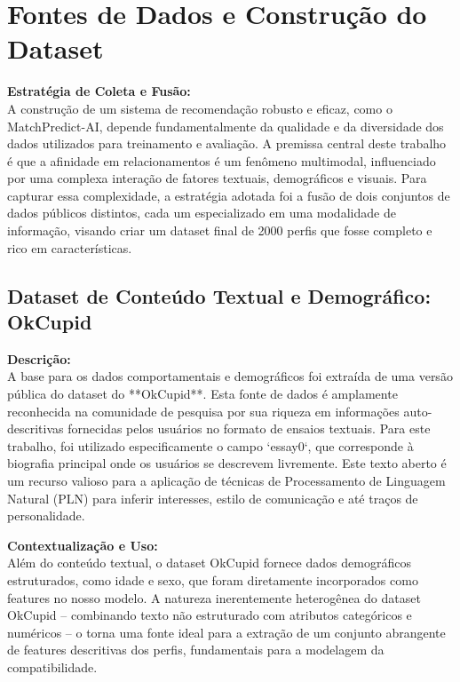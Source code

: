 \section{Fontes de Dados e Construção do Dataset}
\label{sec:dev_fontes_dados}

\textbf{Estratégia de Coleta e Fusão:} \\
A construção de um sistema de recomendação robusto e eficaz, como o MatchPredict-AI, depende fundamentalmente da qualidade e da diversidade dos dados utilizados para treinamento e avaliação. A premissa central deste trabalho é que a afinidade em relacionamentos é um fenômeno multimodal, influenciado por uma complexa interação de fatores textuais, demográficos e visuais. Para capturar essa complexidade, a estratégia adotada foi a fusão de dois conjuntos de dados públicos distintos, cada um especializado em uma modalidade de informação, visando criar um dataset final de 2000 perfis que fosse completo e rico em características.

\subsection{Dataset de Conteúdo Textual e Demográfico: OkCupid}
\textbf{Descrição:} \\
A base para os dados comportamentais e demográficos foi extraída de uma versão pública do dataset do **OkCupid**. Esta fonte de dados é amplamente reconhecida na comunidade de pesquisa por sua riqueza em informações auto-descritivas fornecidas pelos usuários no formato de ensaios textuais. Para este trabalho, foi utilizado especificamente o campo `essay0`, que corresponde à biografia principal onde os usuários se descrevem livremente. Este texto aberto é um recurso valioso para a aplicação de técnicas de Processamento de Linguagem Natural (PLN) para inferir interesses, estilo de comunicação e até traços de personalidade.

\textbf{Contextualização e Uso:} \\
Além do conteúdo textual, o dataset OkCupid fornece dados demográficos estruturados, como idade e sexo, que foram diretamente incorporados como features no nosso modelo. A natureza inerentemente heterogênea do dataset OkCupid -- combinando texto não estruturado com atributos categóricos e numéricos -- o torna uma fonte ideal para a extração de um conjunto abrangente de features descritivas dos perfis, fundamentais para a modelagem da compatibilidade.

